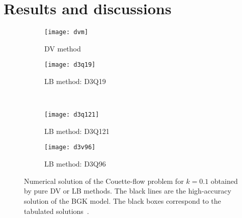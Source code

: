 \documentclass[]{elsarticle} %
\begin{document}
\section{Results and discussions}\label{sec:results}

\begin{figure}
    \centering
    \begin{subfigure}[b]{0.5\textwidth}
        \texttt{[image: dvm]}
        \caption{DV method}
        \label{fig:dvm}
    \end{subfigure}%
    \begin{subfigure}[b]{0.5\textwidth}
        \texttt{[image: d3q19]}
        \caption{LB method: D3Q19}
        \label{fig:d3q19}
    \end{subfigure}\\
    \begin{subfigure}[b]{0.5\textwidth}
        \texttt{[image: d3q121]}
        \caption{LB method: D3Q121}
        \label{fig:d3q121}
    \end{subfigure}%
    \begin{subfigure}[b]{0.5\textwidth}
        \texttt{[image: d3v96]}
        \caption{LB method: D3Q96}
        \label{fig:d3q96}
    \end{subfigure}
    \caption{
        Numerical solution of the Couette-flow problem for $k=0.1$ obtained by pure DV or LB methods.
        The black lines are the high-accuracy solution of the BGK model.
        The black boxes correspond to the tabulated solutions~\cite{Luo2015, Luo2016}.
    }\label{fig:pure}
\end{figure}
\end{document}
